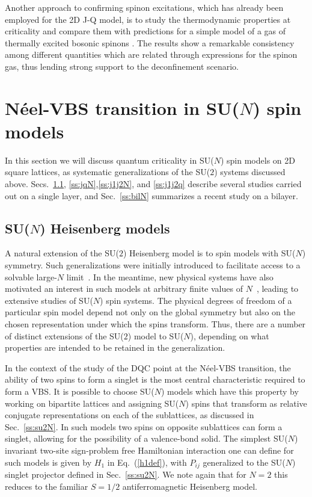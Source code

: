 \documentclass[10pt,pre,aps,twocolumn,showpacs,superscriptaddress,floatfix]{revtex4-1}
\begin{document}
Another approach to confirming spinon excitations, which has already been employed for the 2D J-Q model, is to study the thermodynamic properties at 
criticality and compare them with predictions for a simple model of a gas of thermally excited bosonic spinons \cite{Sandvik11a}. The results show a remarkable 
consistency among different quantities which are related through expressions for the spinon gas, thus lending strong support to the deconfinement scenario.

\section{N\'eel-VBS transition in SU($N$) spin models}
\label{sec:sunmodels}

In this section we will discuss quantum criticality in SU($N$) spin models on 2D square lattices, as systematic generalizations of the SU($2$) systems 
discussed above. Secs.~\ref{ss:j1N}, \ref{ss:jqN},\ref{ss:j1j2N}, and \ref{ss:j1j2q} describe several studies carried out on a single layer, and Sec.~\ref{ss:bilN} summarizes 
a recent study on a bilayer. 

\subsection{SU($N$) Heisenberg models}
\label{ss:j1N}
A natural extension of the SU($2$) Heisenberg model is to spin models with SU($N$) symmetry. Such generalizations were initially introduced to
facilitate access to a solvable large-$N$ limit~\cite{affleck1985:lgN,Read89}. In the meantime, new physical systems have also motivated an interest 
in such models at arbitrary finite values of $N$~\cite{gorshkov2010:sun,kugel1982:kk}, leading to extensive studies of SU($N$) spin systems. The 
physical degrees of freedom of a particular spin model depend not only on the global symmetry but also on the chosen representation under which the 
spins transform. Thus, there are a number of distinct extensions of the SU($2$) model to SU($N$), depending on what properties are intended to be retained 
in the generalization. 

In the context of the study of the DQC point at the N\'eel-VBS transition, the ability of two spins to form a singlet is the most
central characteristic required to form a VBS. It is possible to choose SU($N$) models which have this property by working on bipartite lattices and
assigning SU($N$) spins that transform as relative conjugate representations on each of the sublattices, as discussed in Sec.~\ref{ss:su2N}. In such 
models two spins on opposite sublattices can form a singlet, allowing for the possibility of a valence-bond solid.  The simplest 
SU($N$) invariant two-site sign-problem free Hamiltonian interaction one can define for such models is given by $H_1$ in Eq.~(\ref{h1def}), with $P_{ij}$ 
generalized to the SU($N$) singlet projector defined in Sec.~\ref{ss:su2N}. We note again that for $N=2$ this reduces to the familiar $S=1/2$ 
antiferromagnetic Heisenberg model. 
\end{document}
